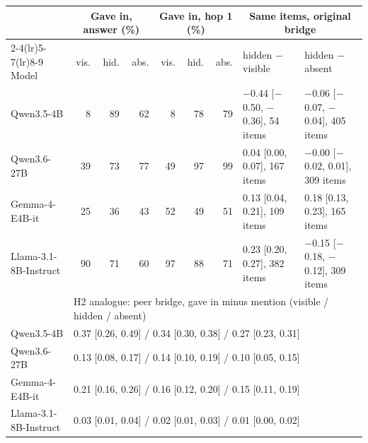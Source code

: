 \begin{tabular}{lrrrrrrll}
\toprule
 & \multicolumn{3}{c}{Gave in, answer (\%)} & \multicolumn{3}{c}{Gave in, hop 1 (\%)} & \multicolumn{2}{c}{Same items, original bridge} \\
\cmidrule(lr){2-4}\cmidrule(lr){5-7}\cmidrule(lr){8-9}
Model & vis. & hid. & abs. & vis. & hid. & abs. & hidden $-$ visible & hidden $-$ absent \\
\midrule
Qwen3.5-4B & 8 & 89 & 62 & 8 & 78 & 79 & $-$0.44 [$-$0.50, $-$0.36], 54 items & $-$0.06 [$-$0.07, $-$0.04], 405 items \\
Qwen3.6-27B & 39 & 73 & 77 & 49 & 97 & 99 & 0.04 [0.00, 0.07], 167 items & $-$0.00 [$-$0.02, 0.01], 309 items \\
Gemma-4-E4B-it & 25 & 36 & 43 & 52 & 49 & 51 & 0.13 [0.04, 0.21], 109 items & 0.18 [0.13, 0.23], 165 items \\
Llama-3.1-8B-Instruct & 90 & 71 & 60 & 97 & 88 & 71 & 0.23 [0.20, 0.27], 382 items & $-$0.15 [$-$0.18, $-$0.12], 309 items \\
\midrule
 & \multicolumn{8}{l}{H2 analogue: peer bridge, gave in minus mention (visible / hidden / absent)} \\
Qwen3.5-4B & \multicolumn{8}{l}{0.37 [0.26, 0.49] / 0.34 [0.30, 0.38] / 0.27 [0.23, 0.31]} \\
Qwen3.6-27B & \multicolumn{8}{l}{0.13 [0.08, 0.17] / 0.14 [0.10, 0.19] / 0.10 [0.05, 0.15]} \\
Gemma-4-E4B-it & \multicolumn{8}{l}{0.21 [0.16, 0.26] / 0.16 [0.12, 0.20] / 0.15 [0.11, 0.19]} \\
Llama-3.1-8B-Instruct & \multicolumn{8}{l}{0.03 [0.01, 0.04] / 0.02 [0.01, 0.03] / 0.01 [0.00, 0.02]} \\
\bottomrule
\end{tabular}

